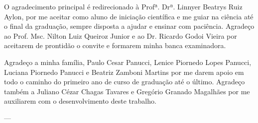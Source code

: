 \documentclass[
    hidelinks,
	12pt,				%
	openany,
	oneside, 
	a4paper,			%
	english,			%
	french,				%
	spanish,			%
	brazil				%
	]{abntex2}
\begin{document}
\begin{agradecimentos}

O agradecimento principal é redirecionado à Profª. Drª. Linnyer Beatrys Ruiz Aylon, por me aceitar como aluno de iniciação científica e me guiar na ciência até o final da graduação, sempre disposta a ajudar e ensinar com paciência. Agradeço ao Prof. Msc. Nilton Luiz Queiroz Junior e ao Dr. Ricardo Godoi Vieira por aceitarem de prontidão o convite e formarem minha banca examinadora.

Agradeço a minha família, Paulo Cesar Panucci, Lenice Piornedo Lopes Panucci, Luciana Piornedo Panucci e Beatriz Zamboni Martins por me darem apoio em todo o caminho do primeiro ano de curso de graduação até o último. Agradeço também a Juliano Cézar Chagas Tavares e Gregório Granado Magalhães por me auxiliarem com o desenvolvimento deste trabalho.

\end{agradecimentos}
---


\end{document}
